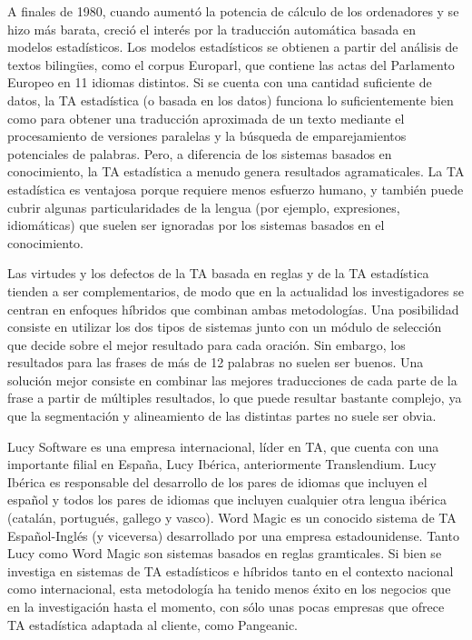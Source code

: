 \begin{multicols}{2}
A finales de 1980, cuando aumentó la potencia de cálculo de los ordenadores y se hizo más barata, creció el interés por la traducción automática basada en modelos estadísticos. Los modelos estadísticos se obtienen a partir del análisis de textos bilingües, como el corpus Europarl, que contiene las actas del Parlamento Europeo en 11 idiomas distintos. Si se cuenta con una cantidad suficiente de datos, la TA estadística (o basada en los datos) funciona lo suficientemente bien como para obtener una traducción aproximada de un texto mediante el procesamiento de versiones paralelas y la búsqueda de emparejamientos potenciales de palabras. Pero, a diferencia de los sistemas basados en conocimiento, la TA estadística a menudo genera resultados agramaticales. La TA estadística es ventajosa porque requiere menos esfuerzo humano, y también puede cubrir algunas particularidades de la lengua (por ejemplo, expresiones, idiomáticas) que suelen ser ignoradas por los sistemas basados en el conocimiento.

Las virtudes y los defectos de la TA basada en reglas y de la TA estadística tienden a ser complementarios, de modo que en la actualidad los investigadores se centran en enfoques híbridos que combinan ambas metodologías. Una posibilidad consiste en  utilizar los dos tipos de sistemas junto con un módulo de selección que decide sobre el mejor resultado para cada oración. Sin embargo, los resultados para las frases de más de 12 palabras no suelen ser buenos. Una solución mejor consiste en combinar las mejores traducciones de cada parte de la frase a partir de múltiples resultados, lo que puede resultar bastante complejo, ya que la segmentación y alineamiento de las distintas partes no suele ser obvia.

Lucy Software es una empresa internacional, líder en TA, que cuenta con una importante filial en España, Lucy Ibérica, anteriormente Translendium. Lucy Ibérica es responsable del desarrollo de los pares de idiomas que incluyen el español y todos los pares de idiomas que incluyen cualquier otra lengua ibérica (catalán, portugués, gallego y vasco). Word Magic es un conocido sistema de TA Español-Inglés (y viceversa) desarrollado por una empresa estadounidense. Tanto Lucy como Word Magic son sistemas basados en reglas gramticales. Si bien se investiga en sistemas de TA estadísticos e híbridos tanto en el contexto nacional como internacional, esta metodología ha tenido menos éxito en los negocios que en la investigación hasta el momento, con sólo unas pocas empresas que ofrece TA estadística adaptada al cliente, como Pangeanic.


\end{multicols}

